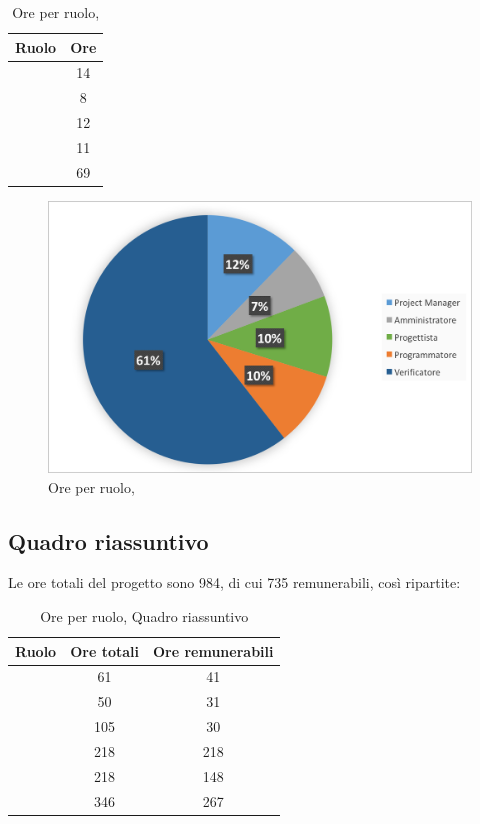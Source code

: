 \begin{table}[h]
	\begin{center}
		\begin{tabular}{|c|c|}
			\hline
			\textbf{Ruolo}	& \textbf{Ore} \\
			\hline
			\Pm &	14\\
			\hline
			\Am	&	8\\
			\hline
			\Prog		&	12\\
			\hline
			\Progr & 11\\
			\hline
			\Ver	&	69\\
			\hline
		\end{tabular}
	\end{center}
	\caption{Ore per ruolo, \VV}
\end{table}

\begin{figure}[H]
	\centering 
	\includegraphics[scale=0.7]{Immagini/GraficiTorte/VV.png}
	\caption{Ore per ruolo, \VV}
\end{figure}
\newpage
\subsection{Quadro riassuntivo}
Le ore totali del progetto sono 984, di cui 735 remunerabili, così ripartite:

\begin{table}[h]
	\begin{center}
		\begin{tabular}{|c|c|c|}
			\hline
			\textbf{Ruolo}	& \textbf{Ore totali} & \textbf{Ore remunerabili} \\
			\hline
			\Pm &	61	&	41	\\
			\hline
			\Am	&	50	&	31	\\
			\hline
			\An		&	105	&	30	\\
			\hline
			\Prog		&	218	&	218	\\
			\hline
			\Progr	&	218	&	148	\\
			\hline
			\Ver	&	346	&	267	\\
			\hline
		\end{tabular}
	\end{center}
	\caption{Ore per ruolo, Quadro riassuntivo}
\end{table}

